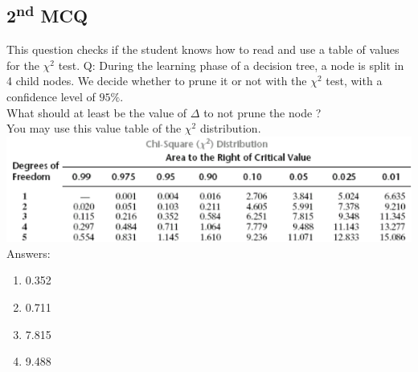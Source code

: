 \documentclass[a4paper, 10pt]{article}
\begin{document}
\subsection{2\textsuperscript{nd} MCQ}
This question checks if the student knows how to read and use a table of values for the $\chi^2$ test.
Q: During the learning phase of a decision tree, a node is split in 4 child nodes. We decide 
whether to prune it or not with the $\chi^2$ test, with a confidence level of $95\%$.
\\
What should at least be the value of $\Delta$ to not prune the node ?
\\
You may use this value table of the $\chi^2$ distribution.
\\
\includegraphics[scale=0.75]{chi2}
\\
Answers:
\begin{enumerate}
    \item 0.352
    \item 0.711
    \item 7.815 \textdagger
    \item 9.488 


\end{enumerate}
\end{document}
